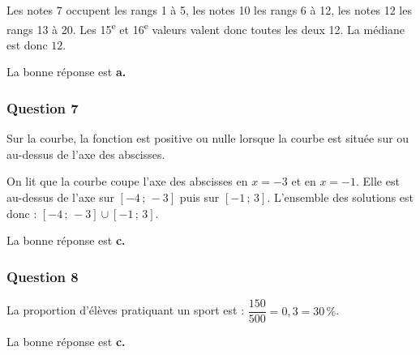 \documentclass[10pt]{article}
\providecommand{\ieme}{\textsuperscript{e}}
\begin{document}
Les notes 7 occupent les rangs 1 à 5, les notes 10 les rangs 6 à 12, les notes 12 les rangs 13 à 20. Les 15\ieme{} et 16\ieme{} valeurs valent donc toutes les deux 12. La médiane est donc $12$.

La bonne réponse est \textbf{a.}

\subsubsection*{Question 7}
Sur la courbe, la fonction est positive ou nulle lorsque la courbe est située sur ou au-dessus de l'axe des abscisses.

On lit que la courbe coupe l'axe des abscisses en $x=-3$ et en $x=-1$. Elle est au-dessus de l'axe sur $[-4\,;\,-3]$ puis sur $[-1\,;\,3]$. L'ensemble des solutions est donc : $[-4\,;\,-3]\cup[-1\,;\,3]$.

La bonne réponse est \textbf{c.}

\subsubsection*{Question 8}
La proportion d'élèves pratiquant un sport est : $\dfrac{150}{500}=0{,}3=30\,\%$.

La bonne réponse est \textbf{c.}




\begin{center}
\end{center}
\end{document}
